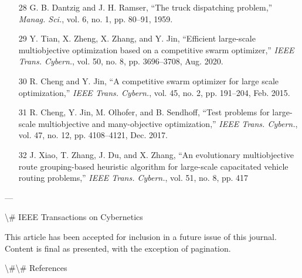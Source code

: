 \documentclass{article}
\begin{document}
\begin{itemize}
		\item [28] G. B. Dantzig and J. H. Ramser, “The truck dispatching problem,” \textit{Manag. Sci.}, vol. 6, no. 1, pp. 80–91, 1959.
		\item [29] Y. Tian, X. Zheng, X. Zhang, and Y. Jin, “Efficient large-scale multiobjective optimization based on a competitive swarm optimizer,” \textit{IEEE Trans. Cybern.}, vol. 50, no. 8, pp. 3696–3708, Aug. 2020.
		\item [30] R. Cheng and Y. Jin, “A competitive swarm optimizer for large scale optimization,” \textit{IEEE Trans. Cybern.}, vol. 45, no. 2, pp. 191–204, Feb. 2015.
		\item [31] R. Cheng, Y. Jin, M. Olhofer, and B. Sendhoff, “Test problems for large-scale multiobjective and many-objective optimization,” \textit{IEEE Trans. Cybern.}, vol. 47, no. 12, pp. 4108–4121, Dec. 2017.
		\item [32] J. Xiao, T. Zhang, J. Du, and X. Zhang, “An evolutionary multiobjective route grouping-based heuristic algorithm for large-scale capacitated vehicle routing problems,” \textit{IEEE Trans. Cybern.}, vol. 51, no. 8, pp. 417
	\end{itemize}
	
	---
	
	\textbackslash{}# IEEE Transactions on Cybernetics
	
	This article has been accepted for inclusion in a future issue of this journal. Content is final as presented, with the exception of pagination.
	
	\textbackslash{}#\textbackslash{}# References
	
\end{document}
